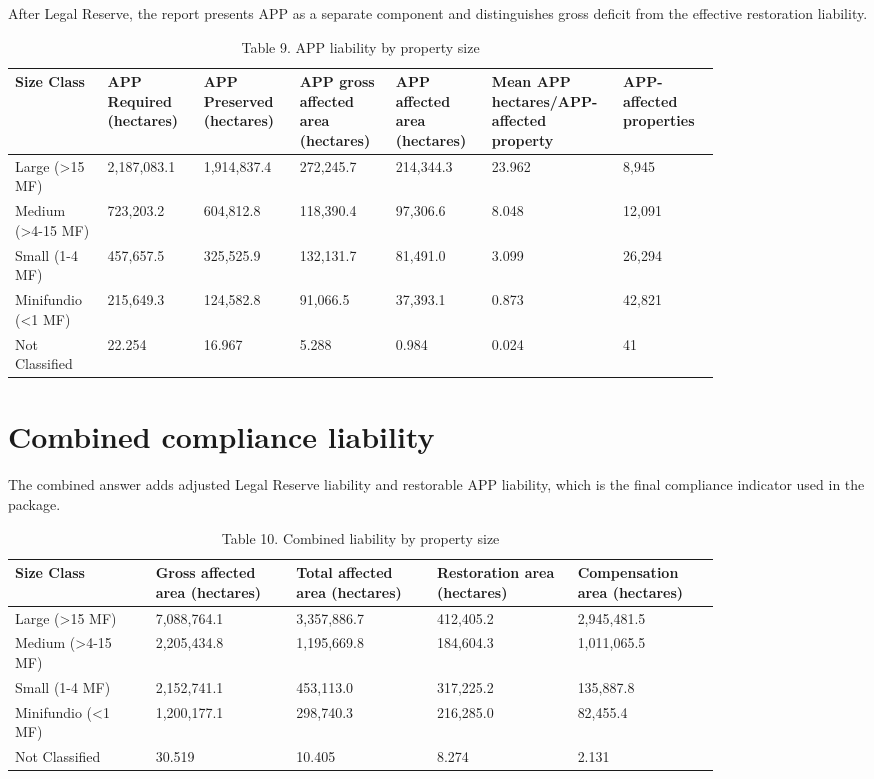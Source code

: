 \documentclass[12pt]{article}
\begin{document}
After Legal Reserve, the report presents APP as a separate component and distinguishes gross deficit from the effective restoration liability.

\begin{table}[H]
\centering
\caption{Table 9. APP liability by property size}
{\fontsize{12}{14}\selectfont
\setlength{\tabcolsep}{3pt}
\renewcommand{\arraystretch}{1.08}
\begin{tabular}{p{0.117\linewidth}p{0.117\linewidth}p{0.117\linewidth}p{0.117\linewidth}p{0.117\linewidth}p{0.117\linewidth}p{0.117\linewidth}}
\toprule
Size Class & APP Required (hectares) & APP Preserved (hectares) & APP gross affected area (hectares) & APP affected area (hectares) & Mean APP hectares/APP-affected property & APP-affected properties \\
\midrule
Large (>15 MF) & 2,187,083.1 & 1,914,837.4 & 272,245.7 & 214,344.3 & 23.962 & 8,945 \\
Medium (>4-15 MF) & 723,203.2 & 604,812.8 & 118,390.4 & 97,306.6 & 8.048 & 12,091 \\
Small (1-4 MF) & 457,657.5 & 325,525.9 & 132,131.7 & 81,491.0 & 3.099 & 26,294 \\
Minifundio (<1 MF) & 215,649.3 & 124,582.8 & 91,066.5 & 37,393.1 & 0.873 & 42,821 \\
Not Classified & 22.254 & 16.967 & 5.288 & 0.984 & 0.024 & 41 \\
\bottomrule
\end{tabular}
}
\end{table}

\section*{Combined compliance liability}

The combined answer adds adjusted Legal Reserve liability and restorable APP liability, which is the final compliance indicator used in the package.

\begin{table}[H]
\centering
\caption{Table 10. Combined liability by property size}
{\fontsize{12}{14}\selectfont
\setlength{\tabcolsep}{3pt}
\renewcommand{\arraystretch}{1.08}
\begin{tabular}{p{0.164\linewidth}p{0.164\linewidth}p{0.164\linewidth}p{0.164\linewidth}p{0.164\linewidth}}
\toprule
Size Class & Gross affected area (hectares) & Total affected area (hectares) & Restoration area (hectares) & Compensation area (hectares) \\
\midrule
Large (>15 MF) & 7,088,764.1 & 3,357,886.7 & 412,405.2 & 2,945,481.5 \\
Medium (>4-15 MF) & 2,205,434.8 & 1,195,669.8 & 184,604.3 & 1,011,065.5 \\
Small (1-4 MF) & 2,152,741.1 & 453,113.0 & 317,225.2 & 135,887.8 \\
Minifundio (<1 MF) & 1,200,177.1 & 298,740.3 & 216,285.0 & 82,455.4 \\
Not Classified & 30.519 & 10.405 & 8.274 & 2.131 \\
\bottomrule
\end{tabular}
}
\end{table}
\end{document}
